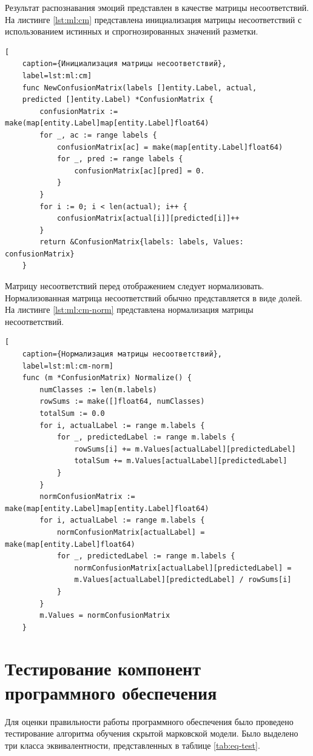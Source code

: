Результат распознавания эмоций представлен в качестве матрицы несоответствий. На листинге \ref{lst:ml:cm} представлена инициализация матрицы несоответствий с использованием истинных и спрогнозированных значений разметки.
\begin{lstlisting}[
	caption={Инициализация матрицы несоответствий},
	label=lst:ml:cm]
	func NewConfusionMatrix(labels []entity.Label, actual,
	predicted []entity.Label) *ConfusionMatrix {
		confusionMatrix := make(map[entity.Label]map[entity.Label]float64)
		for _, ac := range labels {
			confusionMatrix[ac] = make(map[entity.Label]float64)
			for _, pred := range labels {
				confusionMatrix[ac][pred] = 0.
			}
		}
		for i := 0; i < len(actual); i++ {
			confusionMatrix[actual[i]][predicted[i]]++
		}
		return &ConfusionMatrix{labels: labels, Values: confusionMatrix}
	}
\end{lstlisting}
Матрицу несоответствий перед отображением следует нормализовать. Нормализованная матрица несоответствий обычно представляется в виде долей. На листинге \ref{lst:ml:cm-norm} представлена нормализация матрицы несоответствий.
\begin{lstlisting}[
	caption={Нормализация матрицы несоответствий},
	label=lst:ml:cm-norm]
	func (m *ConfusionMatrix) Normalize() {
		numClasses := len(m.labels)
		rowSums := make([]float64, numClasses)
		totalSum := 0.0
		for i, actualLabel := range m.labels {
			for _, predictedLabel := range m.labels {
				rowSums[i] += m.Values[actualLabel][predictedLabel]
				totalSum += m.Values[actualLabel][predictedLabel]
			}
		}
		normConfusionMatrix := make(map[entity.Label]map[entity.Label]float64)
		for i, actualLabel := range m.labels {
			normConfusionMatrix[actualLabel] = make(map[entity.Label]float64)
			for _, predictedLabel := range m.labels {
				normConfusionMatrix[actualLabel][predictedLabel] = 
				m.Values[actualLabel][predictedLabel] / rowSums[i]
			}
		}
		m.Values = normConfusionMatrix
	}
\end{lstlisting}


\section{Тестирование компонент программного обеспечения}
Для оценки правильности работы программного обеспечения было проведено тестирование алгоритма обучения скрытой марковской модели. Было выделено три класса эквивалентности, представленных в таблице \ref{tab:eq-test}.

